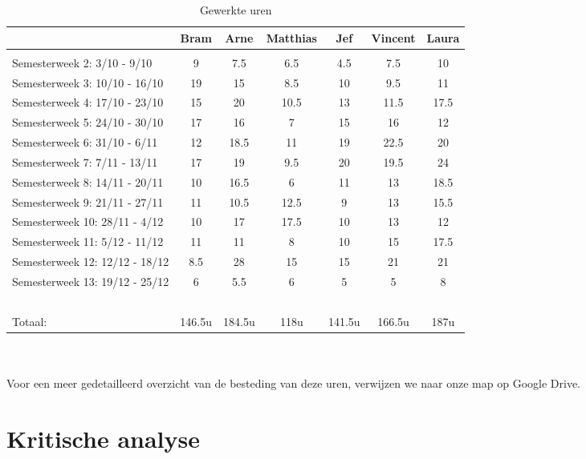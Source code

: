 \documentclass[]{penoverslag}
\begin{document}
\begin{table}[h]
\begin{tabular}{ l c c c c c c }
	& Bram & Arne & Matthias &  Jef & Vincent & Laura\\
	\hline\\
	Semesterweek 2: 3/10 - 9/10 & 9 & 7.5 & 6.5 & 4.5 & 7.5 & 10 \\	
	Semesterweek 3: 10/10 - 16/10 & 19 & 15 & 8.5 & 10 & 9.5 & 11 \\
	Semesterweek 4: 17/10 - 23/10 & 15 & 20 & 10.5 & 13 & 11.5 & 17.5\\
	Semesterweek 5: 24/10 - 30/10 & 17 & 16 & 7 & 15 & 16 & 12\\
	Semesterweek 6: 31/10 - 6/11 & 12 & 18.5 & 11 & 19 & 22.5 & 20\\
	Semesterweek 7: 7/11 - 13/11 & 17 & 19 & 9.5 & 20 & 19.5 & 24\\
	Semesterweek 8: 14/11 - 20/11 & 10 & 16.5 & 6 & 11 & 13 & 18.5\\
	Semesterweek 9: 21/11 - 27/11 & 11 & 10.5 & 12.5 & 9 & 13 & 15.5\\
	Semesterweek 10: 28/11 - 4/12 & 10 & 17 & 17.5 & 10 & 13 & 12\\
	Semesterweek 11: 5/12 - 11/12 & 11 & 11 & 8 & 10 & 15 & 17.5\\
	Semesterweek 12: 12/12 - 18/12  & 8.5 & 28 & 15 & 15 & 21 & 21\\
	Semesterweek 13: 19/12 - 25/12  & 6 & 5.5 & 6 & 5 & 5 & 8\\ 
	~\\
	\hline	
	Totaal: & 146.5u & 184.5u & 118u & 141.5u & 166.5u & 187u
\end{tabular}
\caption{Gewerkte uren}
\label{tabel: gewerkte uren}
\end{table}
\\
\\
Voor een meer gedetailleerd overzicht van de besteding van deze uren, verwijzen we naar onze map op Google Drive.


\section{Kritische analyse}
\end{document}
